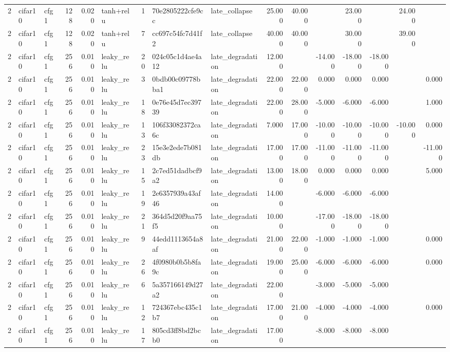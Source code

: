 \begin{table}[htbp]
{\begin{tabular}{@{}rllrrlrllrrrrrrr@{}}
2 & cifar10 & cfg1 & 128 & 0.020 & tanh+relu & 1 & 70e2805222cfe9cc & late\_collapse & 25.000 & 40.000 &  & 23.000 &  & 24.000 &  \\
2 & cifar10 & cfg1 & 128 & 0.020 & tanh+relu & 7 & cc697c54fc7d41f2 & late\_collapse & 40.000 & 40.000 &  & 30.000 &  & 39.000 &  \\
2 & cifar10 & cfg1 & 256 & 0.010 & leaky\_relu & 20 & 024c05c1d4ae4a12 & late\_degradation & 12.000 &  & -14.000 & -18.000 & -18.000 &  &  \\
2 & cifar10 & cfg1 & 256 & 0.010 & leaky\_relu & 3 & 0bdb00c09778bba1 & late\_degradation & 22.000 & 22.000 & 0.000 & 0.000 & 0.000 &  & 0.000 \\
2 & cifar10 & cfg1 & 256 & 0.010 & leaky\_relu & 18 & 0e76e45d7ec39739 & late\_degradation & 22.000 & 28.000 & -5.000 & -6.000 & -6.000 &  & 1.000 \\
2 & cifar10 & cfg1 & 256 & 0.010 & leaky\_relu & 13 & 106f33082372ca6c & late\_degradation & 7.000 & 17.000 & -10.000 & -10.000 & -10.000 & -10.000 & 0.000 \\
2 & cifar10 & cfg1 & 256 & 0.010 & leaky\_relu & 23 & 15e3e2ede7b081db & late\_degradation & 17.000 & 17.000 & -11.000 & -11.000 & -11.000 &  & -11.000 \\
2 & cifar10 & cfg1 & 256 & 0.010 & leaky\_relu & 15 & 2c7ed51dadbcf9a2 & late\_degradation & 13.000 & 18.000 & 0.000 & 0.000 & 0.000 &  & 5.000 \\
2 & cifar10 & cfg1 & 256 & 0.010 & leaky\_relu & 19 & 2e6357939a43af46 & late\_degradation & 14.000 &  & -6.000 & -6.000 & -6.000 &  &  \\
2 & cifar10 & cfg1 & 256 & 0.010 & leaky\_relu & 21 & 364d5d20f9aa75f5 & late\_degradation & 10.000 &  & -17.000 & -18.000 & -18.000 &  &  \\
2 & cifar10 & cfg1 & 256 & 0.010 & leaky\_relu & 9 & 44edd1113654a8af & late\_degradation & 21.000 & 22.000 & -1.000 & -1.000 & -1.000 &  & 0.000 \\
2 & cifar10 & cfg1 & 256 & 0.010 & leaky\_relu & 26 & 4f0980b0b5b8fa9c & late\_degradation & 19.000 & 25.000 & -6.000 & -6.000 & -6.000 &  & 0.000 \\
2 & cifar10 & cfg1 & 256 & 0.010 & leaky\_relu & 6 & 5a357166149d27a2 & late\_degradation & 22.000 &  & -3.000 & -5.000 & -5.000 &  &  \\
2 & cifar10 & cfg1 & 256 & 0.010 & leaky\_relu & 12 & 724367ebc435c1b7 & late\_degradation & 17.000 & 21.000 & -4.000 & -4.000 & -4.000 &  & 0.000 \\
2 & cifar10 & cfg1 & 256 & 0.010 & leaky\_relu & 17 & 805cd3ff8bd2bcb0 & late\_degradation & 17.000 &  & -8.000 & -8.000 & -8.000 &  &  \\

\end{tabular}}
\end{table}
